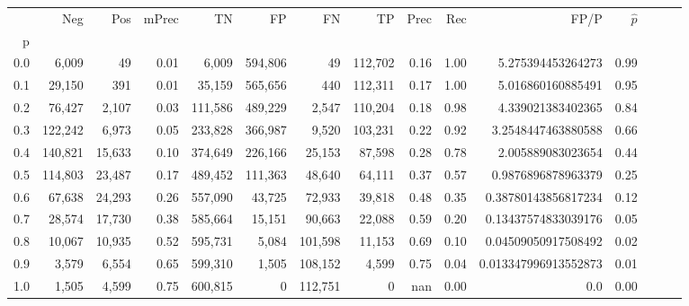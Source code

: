 \begin{tabular}{rrrrrrrrrrrrrrr}
\toprule
{} &      Neg &     Pos & mPrec &       TN &       FP &       FN &       TP &  Prec &   Rec &                  FP/P & $\hat{p}$ \\
p   &          &         &       &          &          &          &          &       &       &                       &           \\
\midrule
0.0 &    6,009 &      49 &  0.01 &    6,009 &  594,806 &       49 &  112,702 &  0.16 &  1.00 &     5.275394453264273 &      0.99 \\
0.1 &   29,150 &     391 &  0.01 &   35,159 &  565,656 &      440 &  112,311 &  0.17 &  1.00 &     5.016860160885491 &      0.95 \\
0.2 &   76,427 &   2,107 &  0.03 &  111,586 &  489,229 &    2,547 &  110,204 &  0.18 &  0.98 &     4.339021383402365 &      0.84 \\
0.3 &  122,242 &   6,973 &  0.05 &  233,828 &  366,987 &    9,520 &  103,231 &  0.22 &  0.92 &    3.2548447463880588 &      0.66 \\
0.4 &  140,821 &  15,633 &  0.10 &  374,649 &  226,166 &   25,153 &   87,598 &  0.28 &  0.78 &     2.005889083023654 &      0.44 \\
0.5 &  114,803 &  23,487 &  0.17 &  489,452 &  111,363 &   48,640 &   64,111 &  0.37 &  0.57 &    0.9876896878963379 &      0.25 \\
0.6 &   67,638 &  24,293 &  0.26 &  557,090 &   43,725 &   72,933 &   39,818 &  0.48 &  0.35 &   0.38780143856817234 &      0.12 \\
0.7 &   28,574 &  17,730 &  0.38 &  585,664 &   15,151 &   90,663 &   22,088 &  0.59 &  0.20 &   0.13437574833039176 &      0.05 \\
0.8 &   10,067 &  10,935 &  0.52 &  595,731 &    5,084 &  101,598 &   11,153 &  0.69 &  0.10 &   0.04509050917508492 &      0.02 \\
0.9 &    3,579 &   6,554 &  0.65 &  599,310 &    1,505 &  108,152 &    4,599 &  0.75 &  0.04 &  0.013347996913552873 &      0.01 \\
1.0 &    1,505 &   4,599 &  0.75 &  600,815 &        0 &  112,751 &        0 &   nan &  0.00 &                   0.0 &      0.00 \\
\bottomrule
\end{tabular}
